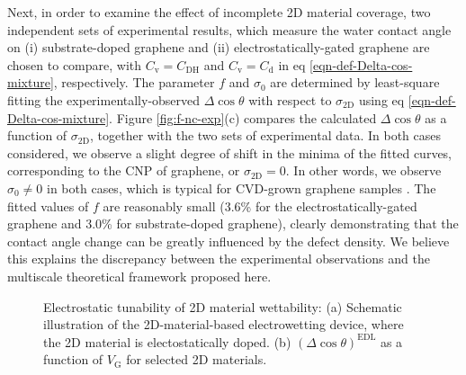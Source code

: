 Next, in order to examine the effect of incomplete 2D material
coverage, two independent sets of experimental results, which measure
the water contact angle on (i) substrate-doped graphene
\cite{ashraf_doping-induced_2016} and (ii) electrostatically-gated
graphene \cite{hong_mechanism_2016} are chosen to compare, with
\(C_{\mathrm{v}} = C_{\mathrm{DH}}\) and \(C_{\mathrm{v}} =
C_{\mathrm{d}}\) in eq \ref{eqn-def-Delta-cos-mixture}, respectively. The
parameter \(f\) and \(\sigma_{0}\) are determined by least-square fitting
the experimentally-observed \(\Delta \cos \theta\) with respect to
\(\sigma_{\mathrm{2D}}\) using eq \ref{eqn-def-Delta-cos-mixture}. Figure
\ref{fig:f-nc-exp}(c) compares the calculated \(\Delta \cos \theta\) as a
function of \(\sigma_{\mathrm{2D}}\), together with the two sets of
experimental data. In both cases considered, we observe a slight
degree of shift in the minima of the fitted curves, corresponding to
the CNP of graphene, or \(\sigma_{\mathrm{2D}} = 0\). In other words, we
observe \(\sigma_{0} \neq 0\) in both cases, which is typical for
CVD-grown graphene samples
\cite{Shih2015PartiallyScreened,goniszewski_correlation_2016}.  The
fitted values of \(f\) are reasonably small (3.6\% for the
electrostatically-gated graphene and 3.0\% for substrate-doped
graphene), clearly demonstrating that the contact angle change can be
greatly influenced by the defect density. We believe this explains the
discrepancy between the experimental observations and the multiscale
theoretical framework proposed here.

\begin{figure}[htbp]
\centering
\caption{\label{fig:dcos-all-2D} Electrostatic tunability of 2D
  material wettability: (a) Schematic illustration of the
  2D-material-based electrowetting device, where the 2D material is
  electostatically doped. (b) \((\Delta\cos\theta)^{\mathrm{EDL}}\) as
  a function of \(V_{\mathrm{G}}\) for selected 2D materials.}
\end{figure}


